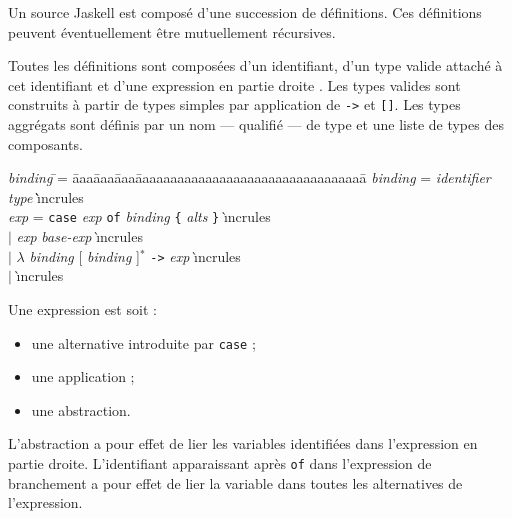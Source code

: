 Un source Jaskell est compos\'e d'une succession de d\'efinitions. Ces
d\'efinitions peuvent \'eventuellement \^etre mutuellement r\'ecursives. 

Toutes les d\'efinitions sont compos\'ees d'un identifiant, d'un type
valide attach\'e \`a cet identifiant et d'une expression en 
partie droite . Les types valides sont construits \`a partir de types 
simples par application de \texttt{->} et \texttt{[]}. Les types
aggr\'egats sont d\'efinis par un nom --- qualifi\'e --- de type et une
liste de types des composants. 

\begin{mytab}
\emph{binding} \= \twocol= \=aaa\=aaa\=aaa\=aaaaaaaaaaaaaaaaaaaaaaaaaaaaaaaaa\=\kill
\emph{binding} \>\twocol=\> \emph{identifier} 
\texttt{\twocol} \emph{type} \`\`{\i}ncrules \\
\emph{exp} \>\twocol=\>  \texttt{case} \emph{exp} \texttt{of}
\emph{binding} \texttt{\{}
\emph{alts} \texttt{\}}   \`{\i}ncrules \\
\> $\mid$ \> \emph{exp}  \emph{base-exp}   \`{\i}ncrules \\
\> $\mid$ \> $\lambda$ \emph{binding} [ \emph{binding} ]$^*$
\texttt{->} \emph{exp}    \`{\i}ncrules \\
\> $\mid$ \>  \`{\i}ncrules \\
\end{mytab}

Une expression est soit :
\begin{itemize}
  \item une alternative introduite par \texttt{case} ;
  \item une application ;
  \item une abstraction.
\end{itemize}
L'abstraction a pour effet de lier les variables identifi\'ees dans
l'expression en partie droite. L'identifiant apparaissant apr\`es
\texttt{of} dans l'expression de branchement a pour effet de lier la
variable dans toutes les alternatives de l'expression. 

